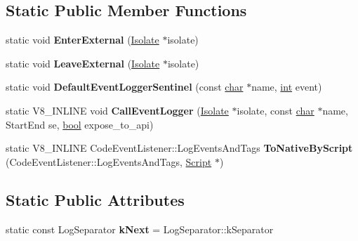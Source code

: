 \subsection*{Static Public Member Functions}
\begin{DoxyCompactItemize}
\item 
\mbox{\label{classv8_1_1internal_1_1Logger_a89b6f2b7d49bb9d19dc26909aee24e65}} 
static void {\bfseries Enter\+External} (\mbox{\hyperlink{classv8_1_1internal_1_1Isolate}{Isolate}} $\ast$isolate)
\item 
\mbox{\label{classv8_1_1internal_1_1Logger_a66eff83e012fb21ad8f2c9b41fcb6aaf}} 
static void {\bfseries Leave\+External} (\mbox{\hyperlink{classv8_1_1internal_1_1Isolate}{Isolate}} $\ast$isolate)
\item 
\mbox{\label{classv8_1_1internal_1_1Logger_a0b3b1025f5f3662c0731bee4f99688be}} 
static void {\bfseries Default\+Event\+Logger\+Sentinel} (const \mbox{\hyperlink{classchar}{char}} $\ast$name, \mbox{\hyperlink{classint}{int}} event)
\item 
\mbox{\label{classv8_1_1internal_1_1Logger_af8ea5dae8b74ed2b23a9b7681efd085c}} 
static V8\+\_\+\+I\+N\+L\+I\+NE void {\bfseries Call\+Event\+Logger} (\mbox{\hyperlink{classv8_1_1internal_1_1Isolate}{Isolate}} $\ast$isolate, const \mbox{\hyperlink{classchar}{char}} $\ast$name, Start\+End se, \mbox{\hyperlink{classbool}{bool}} expose\+\_\+to\+\_\+api)
\item 
\mbox{\label{classv8_1_1internal_1_1Logger_a497f5f9923f71c3566d80b765d714ba7}} 
static V8\+\_\+\+I\+N\+L\+I\+NE Code\+Event\+Listener\+::\+Log\+Events\+And\+Tags {\bfseries To\+Native\+By\+Script} (Code\+Event\+Listener\+::\+Log\+Events\+And\+Tags, \mbox{\hyperlink{classv8_1_1internal_1_1Script}{Script}} $\ast$)
\end{DoxyCompactItemize}
\subsection*{Static Public Attributes}
\begin{DoxyCompactItemize}
\item 
\mbox{\label{classv8_1_1internal_1_1Logger_a86ab9207d5dcd104fba80426bbf9b78d}} 
static const Log\+Separator {\bfseries k\+Next} = Log\+Separator\+::k\+Separator
\end{DoxyCompactItemize}
